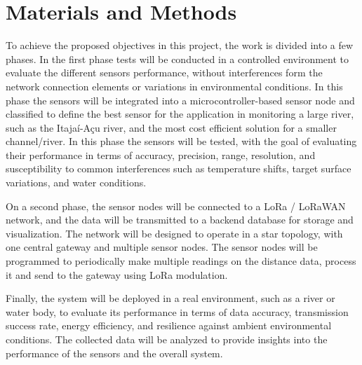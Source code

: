 \chapter{Materials and Methods} \label{cap:materials}





To achieve the proposed objectives in this project, the work is divided into a few phases. In the first phase tests will be conducted in a controlled environment to evaluate the different sensors performance, without interferences form the network connection elements or variations in environmental conditions. In this phase the sensors will be integrated into a microcontroller-based sensor node and classified to define the best sensor for the application in monitoring a large river, such as the Itajaí-Açu river, and the most cost efficient solution for a smaller channel/river. In this phase the sensors will be tested, with the goal of evaluating their performance in terms of accuracy, precision, range, resolution, and susceptibility to common interferences such as temperature shifts, target surface variations, and water conditions. 

On a second phase, the sensor nodes will be connected to a \gls{LoRa} / \gls{LoRaWAN} network, and the data will be transmitted to a backend database for storage and visualization. The network will be designed to operate in a star topology, with one central gateway and multiple sensor nodes. The sensor nodes will be programmed to periodically make multiple readings on the distance data, process it and send  to the gateway using \gls{LoRa} modulation.

Finally, the system will be deployed in a real environment, such as a river or water body, to evaluate its performance in terms of data accuracy, transmission success rate, energy efficiency, and resilience against ambient environmental conditions. The collected data will be analyzed to provide insights into the performance of the sensors and the overall system.

